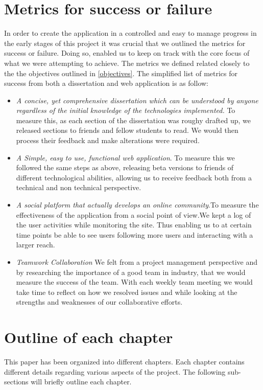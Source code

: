 \section{Metrics for success or failure} \label{metrics}
In order to create the application in a controlled and easy to manage progress in the early stages of this project it was crucial that we outlined the metrics for success or failure. Doing so, enabled us to keep on track with the core focus of what we were attempting to achieve. The metrics we defined related closely to the the objectives outlined in \ref{objectives}. The simplified list of metrics for success from both a dissertation and web application is as follow:
\begin{itemize}
  \item \textit{A concise, yet comprehensive dissertation which can be understood by anyone regardless of the initial knowledge of the technologies implemented.} To measure this, as each section of the dissertation was roughy drafted up, we released sections to friends and fellow students to read. We would then process their feedback and make alterations were required.  
  \item \textit{A Simple, easy to use, functional web application}. To measure this we followed the same steps as above, releasing beta versions to friends of different technological abilities, allowing us to receive feedback both from a technical and non technical perspective.
  \item \textit{A social platform that actually develops an online community}.To measure the effectiveness of the application from a social point of view.We kept a log of the user activities while monitoring the site. Thus enabling us to at certain time points be able to see users following more users and interacting with a larger reach.
  \item \textit{Teamwork Collaboration} We felt from a project management perspective and by researching the importance of a good team in industry, that we would measure the success of the team. With each weekly team meeting we would take time to reflect on how we resolved issues and while looking at the strengths and weaknesses of our collaborative efforts. 
\end{itemize}


\section{Outline of each chapter}
This paper has been organized into different chapters. Each chapter contains different details regarding various aspects of the project. The following sub-sections will briefly outline each chapter.

